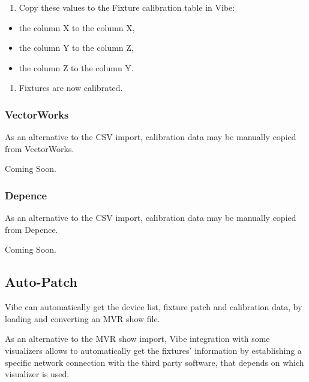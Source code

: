 \documentclass[
]{article}
\providecommand{\tightlist}{%
  \setlength{\itemsep}{0pt}\setlength{\parskip}{0pt}}
\begin{document}
\begin{enumerate}
\def\labelenumi{\arabic{enumi}.}
\setcounter{enumi}{5}
\tightlist
\item
  Copy these values to the Fixture calibration table in Vibe:
\end{enumerate}

\begin{itemize}
\item
  the column X to the column X,
\item
  the column Y to the column Z,
\item
  the column Z to the column Y.
\end{itemize}

\begin{enumerate}
\def\labelenumi{\arabic{enumi}.}
\setcounter{enumi}{6}
\tightlist
\item
  Fixtures are now calibrated.
\end{enumerate}

\hypertarget{vectorworks}{%
\subsubsection{VectorWorks}\label{vectorworks}}

As an alternative to the CSV import, calibration data may be manually copied from VectorWorks.

{Coming Soon.}

\hypertarget{depence}{%
\subsubsection{Depence}\label{depence}}

As an alternative to the CSV import, calibration data may be manually copied from Depence.

{Coming Soon.}

\hypertarget{Auto-Patch-5.11}{%
\subsection{Auto-Patch}\label{Auto-Patch-5.11}}

Vibe can automatically get the device list, fixture patch and calibration data, by loading and converting an MVR show file.

As an alternative to the MVR show import, Vibe integration with some visualizers allows to automatically get the fixtures' information by establishing a specific network connection with the third party software, that depends on which visualizer is used.
\end{document}
